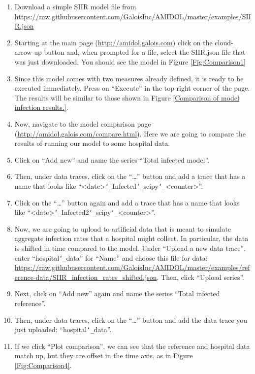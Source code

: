 \documentclass[12pt]{galois-whitepaper}
\renewcommand{\textunderscore}{\texttt{\char`_}}
\begin{document}
\begin{enumerate}
\item Download a simple SIIR model  file from
  \url{https://raw.githubusercontent.com/GaloisInc/AMIDOL/master/examples/SIIR.json}
\item Starting at the main page (\url{http://amidol.galois.com}) click
  on the cloud-arrow-up button and, when prompted for a file, select
  the SIIR.json file that was just downloaded.  You should see the
  model in Figure \ref{Fig:Comparison1}
\item Since this model comes with two measures already defined, it is
  ready to be executed immediately. Press on “Execute” in the top
  right corner of the page.  The results will be similar to those
  shown in Figure \ref{Comparison of model infection results.}.
\item Now, navigate to the model comparison page
  (\url{http://amidol.galois.com/compare.html}). Here we are going to
  compare the results of running our model to some hospital data.
\item Click on “Add new” and name the series “Total infected model”.
\item Then, under data traces,  click on the “…” button and add a
  trace that has a name that looks like
  “<date>\textunderscore{}Infected\textunderscore{}scipy\textunderscore{}<counter>”.
\item Click on the “…” button again and add a trace that has a name
  that looks like “<date>\textunderscore{}Infected2\textunderscore{}scipy\textunderscore{}<counter>”.
\item Now, we are going to upload to artificial data that is meant to
  simulate aggregate infection rates that a hospital might collect. In
  particular, the data is shifted in time compared to the model. Under
  “Upload a new data trace”, enter “hospital\textunderscore{}data” for “Name” and
  choose this file for data:
  \url{https://raw.githubusercontent.com/GaloisInc/AMIDOL/master/examples/reference-data/SIIR_infection_rates_shifted.json}. Then,
  click “Upload series”.
\item Next, click on “Add new” again and name the series “Total
  infected reference”.
\item Then, under data traces,  click on the “…” button and add the
  data trace you just uploaded: “hospital\textunderscore{}data”.
\item If we click “Plot comparison”, we can see that the reference and
  hospital data match up, but they are offset in the time axis, as in
  Figure \ref{Fig:Comparison4}.

\end{enumerate}
\end{document}
